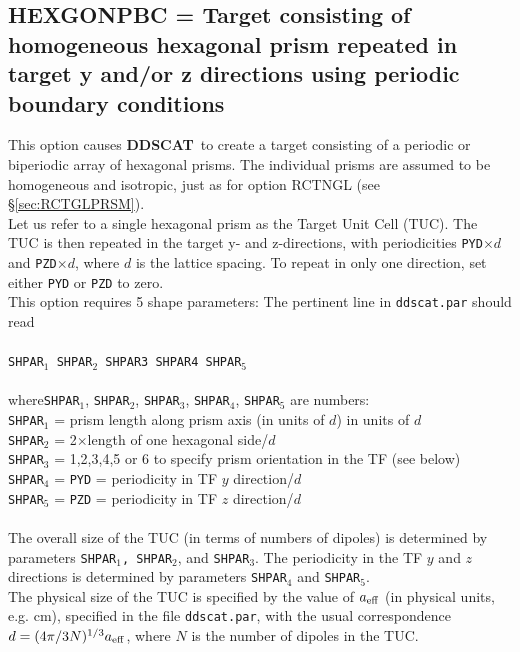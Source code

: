 \subsection{ HEXGONPBC = Target consisting of homogeneous hexagonal prism
                     repeated in
                     target y and/or z directions using
                     periodic boundary conditions}
            \label{sec:HEXGONPBC}
            This option causes {{\bf DDSCAT}}\ to create a target consisting
	    of a periodic or biperiodic array of hexagonal prisms.
	    The individual prisms are assumed to be homogeneous and isotropic,
	    just as for option RCTNGL (see \S\ref{sec:RCTGLPRSM}).
	    \ \\
	    Let us 
	    refer to a single hexagonal prism as the Target Unit Cell (TUC).
	    The TUC 
	    is then repeated in the target y- and z-directions, with 
	    periodicities {\tt PYD}$\times d$ and 
	    {\tt PZD}$\times d$, where $d$ is the lattice spacing.
	    To repeat in only one direction, set either {\tt PYD} or
	    {\tt PZD} to zero.\\
	    This option requires 5 shape parameters:
	    The pertinent line in {\tt ddscat.par} should read\\
	    \ \\
	{\tt SHPAR$_1$ SHPAR$_2$ SHPAR3 SHPAR4 SHPAR}$_5$\\
	    \ \\
	where{\tt SHPAR$_1$}, {\tt SHPAR$_2$}, {\tt SHPAR}$_3$, 
        {\tt SHPAR}$_4$, {\tt SHPAR}$_5$ are numbers: \\
	{\tt SHPAR$_1$} = prism length along prism axis (in units of $d$)
	in units of $d$\\
	{\tt SHPAR$_2$} = 2$\times$length of one hexagonal side/$d$\\
	{\tt SHPAR}$_3$ = 1,2,3,4,5 or 6 to specify prism orientation
	                 in the TF (see below)\\
	{\tt SHPAR}$_4$ = {\tt PYD} = periodicity in TF $y$ direction/$d$\\
	{\tt SHPAR}$_5$ = {\tt PZD} = periodicity in TF $z$ direction/$d$\\
	\ \\
	The overall size of the TUC (in terms of numbers of
	dipoles) is determined by parameters 
	{\tt SHPAR$_1$, SHPAR$_2$}, and {\tt SHPAR}$_3$.
	The periodicity in the TF $y$ and $z$ directions is determined
	by parameters {\tt SHPAR}$_4$ and {\tt SHPAR}$_5$.\\
	The physical size of the TUC is specified by the value of
	${a}_{\rm eff}$ (in physical units, e.g. cm), 
	specified in the file {\tt ddscat.par}, with the usual
	correspondence $d=(4\pi/3N)^{1/3}{a}_{\rm eff}$, where $N$ is the number
	of dipoles in the TUC.


